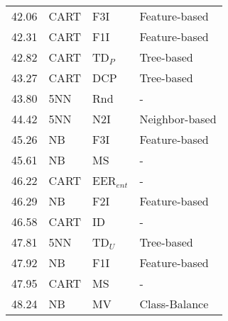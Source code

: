\begin{tabular}{rlll}
42.06 & CART & F3I & Feature-based \\
42.31 & CART & F1I & Feature-based \\
42.82 & CART & TD$_P$ & Tree-based \\
43.27 & CART & DCP & Tree-based \\
43.80 & 5NN & Rnd & - \\
44.42 & 5NN & N2I & Neighbor-based \\
45.26 & NB & F3I & Feature-based \\
45.61 & NB & MS & - \\
46.22 & CART & EER$_{ent}$ & - \\
46.29 & NB & F2I & Feature-based \\
46.58 & CART & ID & - \\
47.81 & 5NN & TD$_U$ & Tree-based \\
47.92 & NB & F1I & Feature-based \\
47.95 & CART & MS & - \\
48.24 & NB & MV & Class-Balance \\
\bottomrule
\end{tabular}
